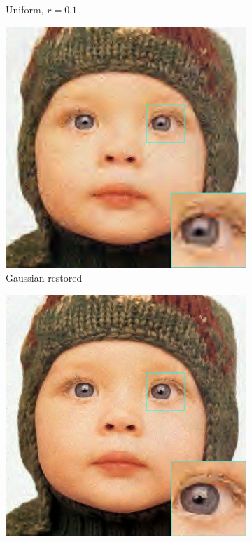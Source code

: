 \begin{figure}
\begin{subfigure}{0.24\textwidth}
		\caption{Uniform, $r=0.1$}
	\end{subfigure}
	\begin{subfigure}{0.24\textwidth}
		\includegraphics[width=\textwidth]{images/exp2.2/gaussian.png}
		\caption{Gaussian restored}
	\end{subfigure}
	\begin{subfigure}{0.24\textwidth}
		\includegraphics[width=\textwidth]{images/exp2.2/poisson.png}

\end{subfigure}
\end{figure}
